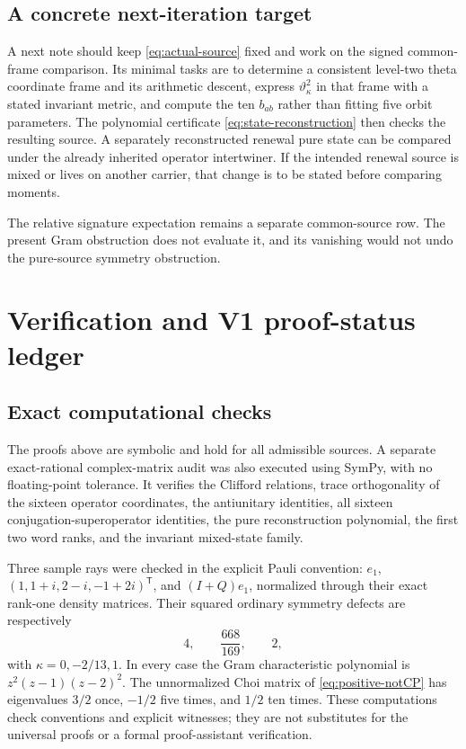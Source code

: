 \documentclass[11pt]{article}
\theoremstyle{definition}
\theoremstyle{remark}
\begin{document}
\subsection{A concrete next-iteration target}
A next note should keep \eqref{eq:actual-source} fixed and work on the signed
common-frame comparison. Its minimal tasks are to determine a consistent
level-two theta coordinate frame and its arithmetic descent, express
$\vartheta_\kappa^2$ in that frame with a stated invariant metric, and compute
the ten $b_{ab}$ rather than fitting five orbit parameters. The polynomial
certificate \eqref{eq:state-reconstruction} then checks the resulting
source. A separately reconstructed renewal pure state can be compared under
the already inherited operator intertwiner. If the intended renewal source
is mixed or lives on another carrier, that change is to be stated before
comparing moments.

The relative signature expectation remains a separate common-source row.
The present Gram obstruction does not evaluate it, and its vanishing would
not undo the pure-source symmetry obstruction.

\section{Verification and V1 proof-status ledger}
\label{sec:status}

\subsection{Exact computational checks}
The proofs above are symbolic and hold for all admissible sources. A
separate exact-rational complex-matrix audit was also executed using
SymPy, with no floating-point tolerance. It verifies the Clifford relations,
trace orthogonality of the sixteen operator coordinates, the antiunitary
identities, all sixteen conjugation-superoperator identities, the pure
reconstruction polynomial, the first two word ranks, and the invariant
mixed-state family.

Three sample rays were checked in the explicit Pauli convention:
$e_1$, $(1,1+i,2-i,-1+2i)^{\mathsf T}$, and $(I+Q)e_1$, normalized through
their exact rank-one density matrices. Their squared ordinary symmetry
defects are respectively
\begin{equation}
 4,\qquad \frac{668}{169},\qquad 2,
\end{equation}
with $\kappa=0,-2/13,1$. In every case the Gram characteristic polynomial is
$z^2(z-1)(z-2)^2$. The unnormalized Choi matrix of
\eqref{eq:positive-notCP} has eigenvalues $3/2$ once, $-1/2$ five times, and
$1/2$ ten times. These computations check conventions and explicit witnesses;
they are not substitutes for the universal proofs or a formal proof-assistant
verification.
\end{document}
